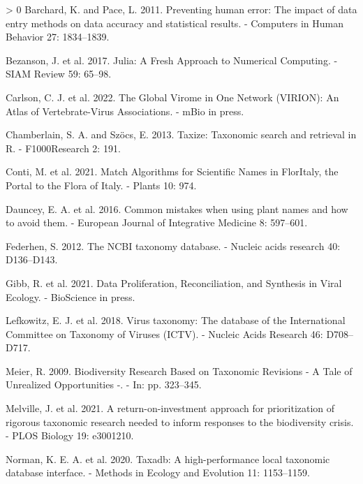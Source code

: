 \documentclass[10pt,oneside]{article}
\newlength{\cslhangindent}
\newenvironment{CSLReferences}[3] %
 {%
  \setlength{\parindent}{0pt}
  \ifodd #1 \everypar{\setlength{\hangindent}{\cslhangindent}}\ignorespaces\fi
  \ifnum #2 > 0
  \setlength{\parskip}{#2\baselineskip}
  \fi
 }%
 {}
\begin{document}
\hypertarget{refs}{}
\begin{CSLReferences}{1}{0}
\leavevmode\hypertarget{ref-Barchard2011PreHum}{}%
Barchard, K. and Pace, L. 2011. Preventing human error: The impact of
data entry methods on data accuracy and statistical results. - Computers
in Human Behavior 27: 1834--1839.

\leavevmode\hypertarget{ref-Bezanson2017JulFre}{}%
Bezanson, J. et al. 2017. Julia: A Fresh Approach to Numerical
Computing. - SIAM Review 59: 65--98.

\leavevmode\hypertarget{ref-Carlson2022GloVir}{}%
Carlson, C. J. et al. 2022. The Global Virome in One Network (VIRION):
An Atlas of Vertebrate-Virus Associations. - mBio in press.

\leavevmode\hypertarget{ref-Chamberlain2013TaxTax}{}%
Chamberlain, S. A. and Szöcs, E. 2013. Taxize: Taxonomic search and
retrieval in R. - F1000Research 2: 191.

\leavevmode\hypertarget{ref-Conti2021MatAlg}{}%
Conti, M. et al. 2021. Match Algorithms for Scientific Names in
FlorItaly, the Portal to the Flora of Italy. - Plants 10: 974.

\leavevmode\hypertarget{ref-Dauncey2016ComMis}{}%
Dauncey, E. A. et al. 2016. Common mistakes when using plant names and
how to avoid them. - European Journal of Integrative Medicine 8:
597--601.

\leavevmode\hypertarget{ref-Federhen2012NcbTax}{}%
Federhen, S. 2012. The NCBI taxonomy database. - Nucleic acids research
40: D136--D143.

\leavevmode\hypertarget{ref-Gibb2021DatPro}{}%
Gibb, R. et al. 2021. Data Proliferation, Reconciliation, and Synthesis
in Viral Ecology. - BioScience in press.

\leavevmode\hypertarget{ref-Lefkowitz2018VirTax}{}%
Lefkowitz, E. J. et al. 2018. Virus taxonomy: The database of the
International Committee on Taxonomy of Viruses (ICTV). - Nucleic Acids
Research 46: D708--D717.

\leavevmode\hypertarget{ref-Meier2009BioRes}{}%
Meier, R. 2009. Biodiversity Research Based on Taxonomic Revisions - A
Tale of Unrealized Opportunities -. - In: pp. 323--345.

\leavevmode\hypertarget{ref-Melville2021RetApp}{}%
Melville, J. et al. 2021. A return-on-investment approach for
prioritization of rigorous taxonomic research needed to inform responses
to the biodiversity crisis. - PLOS Biology 19: e3001210.

\leavevmode\hypertarget{ref-Norman2020TaxHig}{}%
Norman, K. E. A. et al. 2020. Taxadb: A high-performance local taxonomic
database interface. - Methods in Ecology and Evolution 11: 1153--1159.


\end{CSLReferences}
\end{document}
